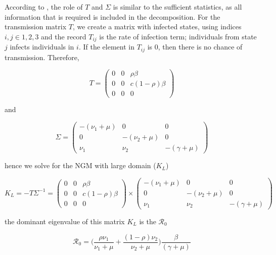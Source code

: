 \documentclass[12pt]{article}
\begin{document}
According to \cite{Diekmann:2010}, the role of $T$ and $\Sigma$ is similar to the sufficient statistics, as all information that is required is included in the decomposition. For the transmission matrix $T$, we create a matrix with infected states, using indices $i, j\in {1, 2, 3}$ and the record $T_{ij}$ is the rate of infection term; individuals from state $j$ infects individuals in $i$. If the element in $T_{ij}$ is 0, then there is no chance of transmission.  Therefore, 

\begin{equation*}
T=
\begin{pmatrix}
0 & 0 & \rho \beta\\
0 & 0 & c (1-\rho)\beta\\
0 & 0 & 0
\end{pmatrix}
\end{equation*}

and 

\begin{equation*}
\Sigma=
\begin{pmatrix}
-(\nu_{1}+\mu) & 0 & 0\\
0 & -(\nu_{2}+\mu) & 0\\
\nu_{1} &  \nu_{2}& -(\gamma + \mu)
\end{pmatrix}
\end{equation*}

hence we solve for the NGM with large domain ($K_{L}$)

\begin{equation*}
K_{L} = -T\Sigma^{-1} = 
\begin{pmatrix}
0 & 0 & \rho \beta\\
0 & 0 & c (1-\rho)\beta\\
0 & 0 & 0
\end{pmatrix}
\times
\begin{pmatrix}
-(\nu_{1}+\mu) & 0 & 0\\
0 & -(\nu_{2}+\mu) & 0\\
\nu_{1} &  \nu_{2}& -(\gamma + \mu)
\end{pmatrix}
\end{equation*}

the dominant eigenvalue of this matrix $K_{L}$ is the $\mathcal{R}_{0}$

\begin{equation}
\mathcal{R}_{0} = \bigg( \frac{\rho \nu_{1}}{\nu_{1} + \mu} + \frac{(1-\rho) \nu_{2}}{\nu_{2} + \mu}  \bigg) \frac{\beta}{(\gamma + \mu)}
\end{equation}
\end{document}
